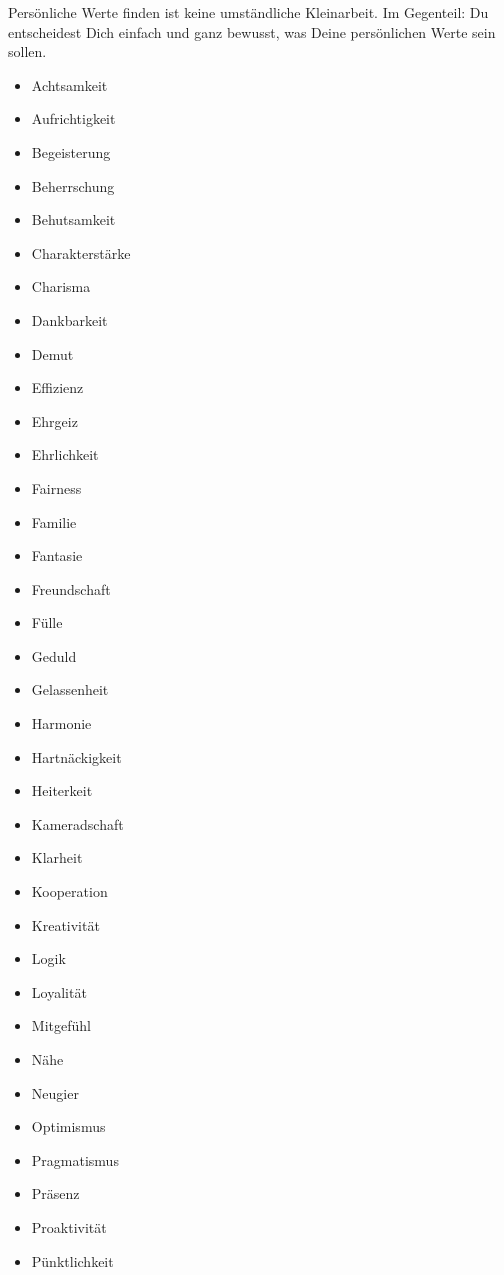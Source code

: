\documentclass[../Lebensziel.tex]{subfiles}
\begin{document}
Persönliche Werte finden ist keine umständliche Kleinarbeit. Im Gegenteil: Du entscheidest Dich einfach und ganz bewusst, was Deine persönlichen Werte sein sollen.

\begin{multicols}{3}
    \begin{itemize}
        \item Achtsamkeit
        \item Aufrichtigkeit
        \item Begeisterung
        \item Beherrschung
        \item Behutsamkeit
        \item Charakterstärke
        \item Charisma
        \item Dankbarkeit
        \item Demut
        \item Effizienz
        \item Ehrgeiz
        \item Ehrlichkeit
        \item Fairness
        \item Familie
        \item Fantasie
        \item Freundschaft
        \item Fülle
        \item Geduld
        \item Gelassenheit
        \item Harmonie
        \item Hartnäckigkeit
        \item Heiterkeit
        \item Kameradschaft
        \item Klarheit
        \item Kooperation
        \item Kreativität
        \item Logik
        \item Loyalität
        \item Mitgefühl
        \item Nähe
        \item Neugier
        \item Optimismus
        \item Pragmatismus
        \item Präsenz
        \item Proaktivität
        \item Pünktlichkeit

\end{itemize}
\end{multicols}
\end{document}

